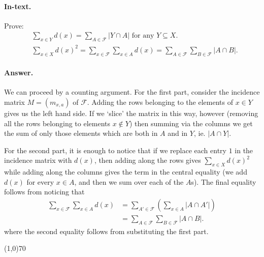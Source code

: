 \paragraph{In-text.} Prove:
\begin{align}
	&\sum_{x\in Y} d(x)=\sum_{A\in\mathcal{F}}|Y\cap A| \text{ for any } Y\subseteq X.\\
	&\sum_{x\in X}d(x)^2=\sum_{x\in\mathcal{F}}\sum_{x\in A}d(x)=\sum_{A\in\mathcal{F}}\sum_{B\in\mathcal{F}}|A\cap B|.
\end{align}

\paragraph{Answer.} We can proceed by a counting argument. For the first part, consider the incidence matrix $M=(m_{x,a})$ of $\mathcal{F}$. Adding the rows belonging to the elements of $x\in Y$ gives us the left hand side. If we `slice' the matrix in this way, however (removing all the rows belonging to elements $x\notin Y$) then summing via the columns we get the sum of only those elements which are both in $A$ and in $Y$, ie. $|A\cap Y|$.

For the second part, it is enough to notice that if we replace each entry $1$ in the incidence matrix with $d(x)$, then adding along the rows gives $\sum_{x\in X}d(x)^2$ while adding along the columns gives the term in the central equality (we add $d(x)$ for every $x\in A$, and then we sum over each of the $A$s). The final equality follows from noticing that
\begin{align*}
	\sum_{x\in\mathcal{F}}\sum_{x\in A}d(x)&=\sum_{A'\in\mathcal{F}}\left(\sum_{x\in A}|A\cap A'|\right)\\
	&=\sum_{A\in\mathcal{F}}\sum_{B\in\mathcal{F}}|A\cap B|.
\end{align*}
where the second equality follows from substituting the first part.


\begin{center}
	\line(1,0){70}
\end{center}

